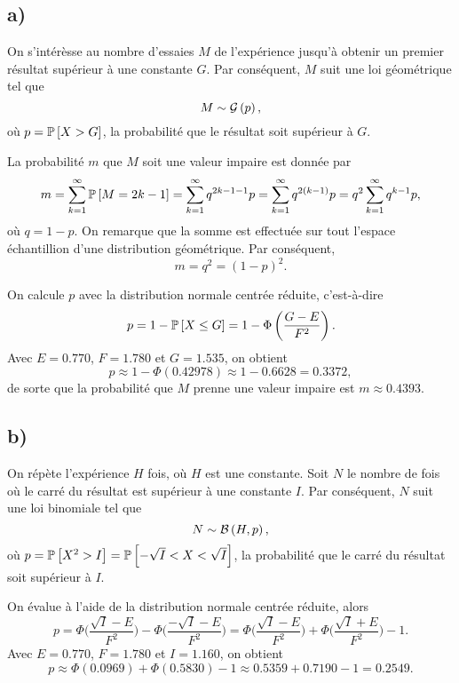\documentclass[11pt]{article}
\renewcommand\P[1]{%
	\ensuremath{%
		\mathbb{P}\left[#1\right]%
	}%
}%
\newcommand\Bin[2]{%
	\ensuremath{%
		\mathcal{B}\left(#1,#2\right)%
	}%
}%
\newcommand\Geo[1]{%
	\ensuremath{%
		\mathcal{G}\left(#1\right)%
	}%
}%
\begin{document}
\subsection*{a)}
On s'intérèsse au nombre d'essaies $M$ de l'expérience jusqu'à obtenir
un premier résultat supérieur à une constante $G$. Par conséquent, $M$
suit une loi géométrique tel que
\begin{equation*}
    M\sim\Geo{p},
\end{equation*}
où $p=\P{X>G}$, la probabilité que le résultat soit supérieur à $G$.

La probabilité $m$ que $M$ soit une valeur impaire est donnée par
\begin{equation*}
    m
    =\sum_{k=1}^\infty\P{M=2k-1}
    =\sum_{k=1}^\infty q^{2k-1-1}p
    =\sum_{k=1}^\infty q^{2(k-1)}p
    =q^2\sum_{k=1}^\infty q^{k-1}p,
\end{equation*}
où $q=1-p$. On remarque que la somme est effectuée sur tout l'espace
échantillion d'une distribution géométrique. Par conséquent,
\begin{equation*}
    m=q^2=(1-p)^2.
\end{equation*}

On calcule $p$ avec la distribution normale centrée réduite, c'est-à-dire
\begin{equation*}
    p
    =1-\P{X\leq G}
    =1-\Phi\left(\frac{G-E}{F^2}\right).
\end{equation*}
Avec $E=0.770$, $F=1.780$ et $G=1.535$, on obtient
\begin{equation*}
    p
    \approx 1-\Phi\left(0.42978\right)
    \approx 1-0.6628
    =0.3372,
\end{equation*}
de sorte que la probabilité que $M$ prenne une valeur impaire est
$m\approx 0.4393$.

\subsection{b)}
On répète l'expérience $H$ fois, où $H$ est une constante. Soit $N$ le
nombre de fois où le carré du résultat est supérieur à une constante $I$.
Par conséquent, $N$ suit une loi binomiale tel que
\begin{equation*}
    N\sim\Bin{H}{p},
\end{equation*}
où $p=\P{X^2>I}=\P{-\sqrt{I}<X<\sqrt{I}}$, la probabilité que le carré
du résultat soit supérieur à $I$.

On évalue à l'aide de la distribution normale centrée réduite, alors
\begin{equation*}
    p
    =\Phi\bigg(\frac{ \sqrt{I}-E}{F^2}\bigg)
    -\Phi\bigg(\frac{-\sqrt{I}-E}{F^2}\bigg)
    =\Phi\bigg(\frac{ \sqrt{I}-E}{F^2}\bigg)
    +\Phi\bigg(\frac{ \sqrt{I}+E}{F^2}\bigg)-1.
\end{equation*}
Avec $E=0.770$, $F=1.780$ et $I=1.160$, on obtient
\begin{equation*}
    p
    \approx\Phi\left(0.0969\right)+\Phi\left(0.5830\right)-1
    \approx 0.5359+0.7190-1
    =0.2549.
\end{equation*}
\end{document}
